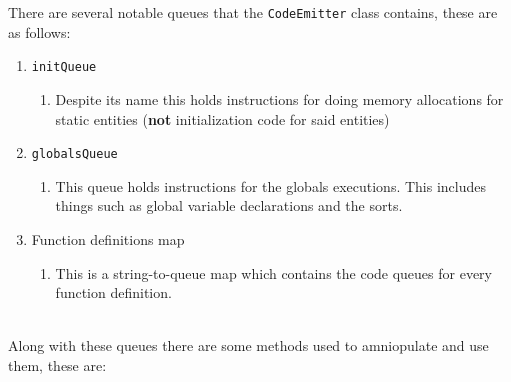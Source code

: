 There are several notable queues that the \texttt{CodeEmitter} class
contains, these are as follows:
\begin{enumerate}
\item \texttt{initQueue}
\begin{enumerate}
\item Despite its name this holds instructions for doing memory allocations
for static entities (\textbf{not} initialization code for said entities)
\end{enumerate}
\item \texttt{globalsQueue}
\begin{enumerate}
\item This queue holds instructions for the globals executions. This includes
things such as global variable declarations and the sorts.
\end{enumerate}
\item Function definitions map
\begin{enumerate}
\item This is a string-to-queue map which contains the code queues for every
function definition.
\end{enumerate}
\end{enumerate}
~\\
Along with these queues there are some methods used to amniopulate
and use them, these are:
